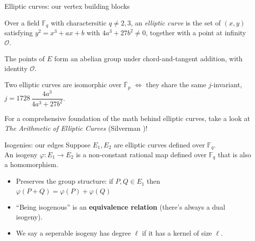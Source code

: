 \documentclass[10pt,aspectratio=169]{beamer}
\begin{document}
\begin{frame}{Elliptic curves: our vertex building blocks}
  \begin{definition}
    Over a field $\mathbb{F}_q$ with charactersitic $q \neq 2,3$, an \emph{elliptic curve} is the set of
    $(x,y)$ satisfying $y^2 = x^3 + ax + b$ with $4a^3 + 27b^2 \neq 0$, together with a point at
    infinity $\mathcal{O}$.
  \end{definition}
  \vspace{0.5em}
  \begin{theorem}
    The points of $E$ form an abelian group under chord-and-tangent addition, with identity $\mathcal{O}$.
  \end{theorem}
  \vspace{0.5em}
  \begin{theorem}
    Two elliptic curves are isomorphic over $\overline{\mathbb{F}}_p$ $\iff$ they share the same $j$-invariant,
    $j = 1728\,\dfrac{4a^3}{4a^3 + 27b^2}$.
  \end{theorem}
  For a comprehensive foundation of the math behind elliptic curves, take a look at \textit{The Arithmetic
of Elliptic Curves} (Silverman \cite{silverman})!
\end{frame}

\begin{frame}{Isogenies: our edges}
  Suppose $E_1,E_2$ are elliptic curves defined over $\mathbb{F}_q$. \\
  An \alert{isogeny} $\varphi: E_1 \to E_2$ is a non-constant rational map defined over $\mathbb{F}_q$ that is also a homomorphism.
  \begin{itemize}[<+(1)->]
    \item Preserves the group structure: if $P,Q\in E_1$ then $\varphi(P+Q) = \varphi(P)+\varphi(Q)$
    \item ``Being isogenous'' is an \textbf{equivalence relation} (there's always a dual isogeny).
    \item We say a seperable isogeny has \alert{degree} $\ell$ if it has a kernel of size $\ell$.
  \end{itemize}
  \vspace{0.8em}
  \centering
\end{frame}
\end{document}
